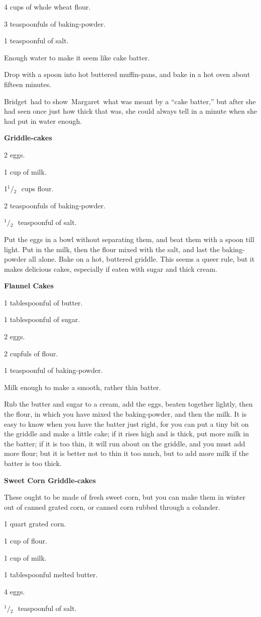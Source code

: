 \documentclass[11pt]{book}
\newcommand{\indpar}{\par\noindent\hspace*{\parindent}}
\newcommand{\ingredient}{\indpar}
\newcommand{\instruction}{\indpar}
\newcommand{\OneHalf}{\ensuremath{{}^1\!\!/\!{}_2\mbox{\ }}}
\newenvironment{RecipeTitle}{\medskip\begin{center}\large\bf }{\end{center}\smallskip}
\begin{document}
\ingredient  4 cups of whole wheat flour.
\ingredient  3 teaspoonfuls of baking-powder.
\ingredient  1 teaspoonful of salt.
\ingredient  Enough water to make it seem like cake batter.
\instruction
  Drop with a spoon into hot buttered muffin-pans, and bake
in a hot oven about fifteen minutes.
\instruction
  Bridget\, had to show\, Margaret\, what was meant by a ``cake batter,''
but after she had seen once just how thick that was, she could
always tell in a minute when she had put in water enough.
\begin{RecipeTitle}
Griddle-cakes\label{griddle_cakes}
\end{RecipeTitle}
\ingredient  2 eggs.
\ingredient  1 cup of milk.
\ingredient  1\OneHalf cups flour.
\ingredient  2 teaspoonfuls of baking-powder.
\ingredient  \OneHalf teaspoonful of salt.
\instruction  Put the eggs in a bowl without separating them, and beat
them with a spoon till light.  Put in the milk, then the flour
mixed with the salt, and last the baking-powder all alone.  Bake
on a hot, buttered griddle.  This seems a queer rule, but it makes
delicious cakes, especially if eaten with sugar and thick cream.\pagebreak[4]
\begin{RecipeTitle}
Flannel Cakes\label{flannel_cakes}
\end{RecipeTitle}
\ingredient  1 tablespoonful of butter.
\ingredient  1 tablespoonful of sugar.
\ingredient  2 eggs.
\ingredient  2 cupfuls of flour.
\ingredient  1 teaspoonful of baking-powder.
\ingredient  Milk enough to make a smooth, rather thin batter.
\instruction
  Rub the butter and sugar to a cream, add the eggs, beaten
together lightly, then the flour, in which you have mixed the
baking-powder, and then the milk.  It is easy to know when you
have the batter just right, for you can put a tiny bit on the
griddle and make a little cake; if it rises high and is thick,
put more milk in the batter; if it is too thin, it will run
about on the griddle, and you must add more flour; but it is
better not to thin it too much, but to add more milk if the
batter is too thick.
\begin{RecipeTitle}
Sweet Corn Griddle-cakes\label{sweet_corn_griddle_cakes}
\end{RecipeTitle}
\instruction
  These ought to be made of fresh sweet corn, but you can
make them in winter out of canned grated corn, or canned corn
rubbed through a colander.
\ingredient  1 quart grated corn.
\ingredient  1 cup of flour.
\ingredient  1 cup of milk.
\ingredient  1 tablespoonful melted butter.
\ingredient  4 eggs.
\ingredient  \OneHalf teaspoonful of salt.
\end{document}
